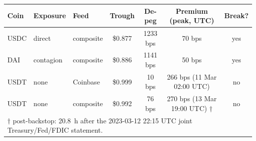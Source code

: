 \begin{tabular}{@{}lllcccc@{}}
\toprule
Coin & Exposure & Feed & Trough & De-peg & Premium (peak, UTC) & Break? \\
\midrule
USDC & direct & composite & \$0.877 & 1233 bps & 70 bps & yes \\
DAI & contagion & composite & \$0.886 & 1141 bps & 50 bps & yes \\
USDT & none & Coinbase & \$0.999 & 10 bps & 266 bps (11 Mar 02:00 UTC) & no \\
USDT & none & composite & \$0.992 & 76 bps & 270 bps (13 Mar 19:00 UTC) $\dagger$ & no \\
\bottomrule
\multicolumn{7}{p{0.93\linewidth}}{$\dagger$ post-backstop: 20.8~h after the 2023-03-12 22:15 UTC joint Treasury/Fed/FDIC statement.} \\
\end{tabular}
